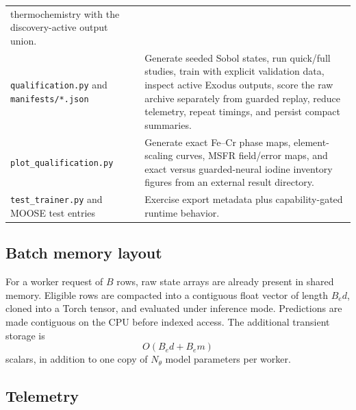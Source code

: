 \documentclass[11pt]{article}
\newcommand{\code}[1]{\texttt{#1}}
\begin{document}
\begin{longtable}{L{0.36\textwidth}L{0.56\textwidth}}
  thermochemistry with the discovery-active output union. \\
  \code{qualification.py} and \code{manifests/*.json} &
  Generate seeded Sobol states, run quick/full studies, train with explicit validation data,
  inspect active Exodus outputs, score the raw archive separately from guarded replay, reduce
  telemetry, repeat timings, and persist compact summaries. \\
  \code{plot\_qualification.py} &
  Generate exact Fe--Cr phase maps, element-scaling curves, MSFR field/error maps, and exact versus
  guarded-neural iodine inventory figures from an external result directory. \\
  \code{test\_trainer.py} and MOOSE test entries &
  Exercise export metadata plus capability-gated runtime behavior. \\
  \bottomrule
\end{longtable}

\subsection{Batch memory layout}

For a worker request of \(B\) rows, raw state arrays are already present in shared memory.  Eligible
rows are compacted into a contiguous float vector of length \(B_e d\), cloned into a Torch tensor,
and evaluated under inference mode.  Predictions are made contiguous on the CPU before indexed
access.  The additional transient storage is
\begin{equation}
  O(B_e d+B_e m)
  \label{eq:batch-memory}
\end{equation}
scalars, in addition to one copy of \(N_{\theta}\) model parameters per worker.

\subsection{Telemetry}
\end{document}
